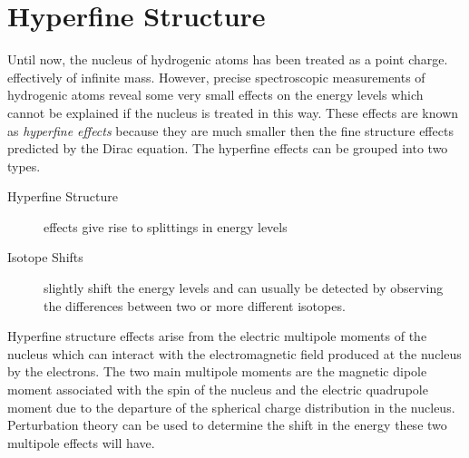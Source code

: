 \documentclass[a4paper]{serif}
\begin{document}
\section{Hyperfine Structure}
    Until now, the nucleus of hydrogenic atoms has been treated as a point charge.
    effectively of infinite mass. However, precise spectroscopic measurements 
    of hydrogenic atoms reveal some very small effects on the energy levels which
    cannot be explained if the nucleus is treated in this way. These effects are
    known as \emph{hyperfine effects} because they are much smaller then the fine
    structure effects predicted by the Dirac equation. The hyperfine effects can
    be grouped into two types.
    \begin{description}
        \item[Hyperfine Structure] effects give rise to splittings in energy levels
        \item[Isotope Shifts] slightly shift the energy levels and can usually be 
              detected by observing the differences between two or more 
              different isotopes.
    \end{description}
    Hyperfine structure effects arise from the electric multipole moments of the 
    nucleus which can interact with the electromagnetic field produced at the 
    nucleus by the electrons. The two main multipole moments are the magnetic 
    dipole moment associated with the spin of the nucleus and the electric quadrupole
    moment due to the departure of the spherical charge distribution in the nucleus.
    Perturbation theory can be used to determine the shift in the energy these
    two multipole effects will have.
       
\end{document}
